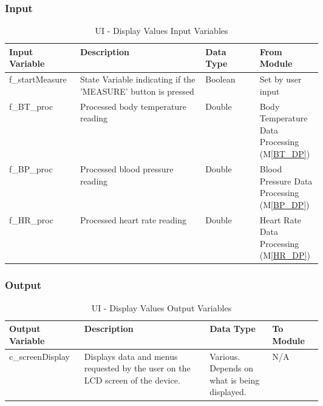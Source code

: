 \documentclass{article}
\begin{document}
\begin{description}
        \subsubsection{Input}
            \begin{longtable}{|l|p{0.4\linewidth}|l|p{0.20\linewidth}|}
            \caption{UI - Display Values Input Variables}
            \hline
            \textbf{Input Variable} & \textbf{Description} & \textbf {Data Type} & \textbf{From Module} \\
            \endhead
            \hline
            f\_startMeasure   & State Variable indicating if the 'MEASURE' button is pressed & Boolean & Set by user input \\
            \hline
            f\_BT\_proc   & Processed body temperature reading & Double & Body Temperature Data Processing (M\ref{BT_DP})\\
            \hline
            f\_BP\_proc   & Processed blood pressure reading & Double & Blood Pressure Data Processing (M\ref{BP_DP})\\
            \hline
            f\_HR\_proc   & Processed heart rate reading & Double & Heart Rate Data Processing (M\ref{HR_DP})\\
            \hline
            \end{longtable}
        \subsubsection{Output}
           \begin{longtable}{|l|p{0.4\linewidth}|p{0.2\linewidth}|l|}
           \caption{UI - Display Values Output Variables}
            \hline
            \textbf{Output Variable} & \textbf{Description} & \textbf {Data Type} & \textbf{To Module} \\
            \endhead
            \hline
            c\_screenDisplay   & Displays data and menus requested by the user on the LCD screen of the device. & Various. Depends on what is being displayed. & N/A \\
            \hline
            \end{longtable}

\end{description}
\end{document}
